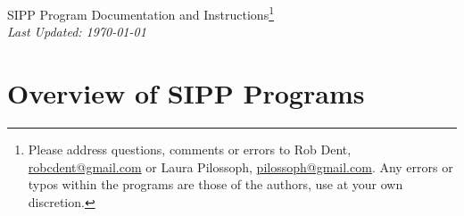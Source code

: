 \documentclass{article}
\begin{document}
\begin{center}
{\Large \sc SIPP Program Documentation and Instructions\footnote{Please address questions, comments or errors to Rob Dent, \href{mailto:robcdent@gmail.com}{robcdent@gmail.com} or Laura Pilossoph, \href{mailto:pilossoph@gmail.com}{pilossoph@gmail.com}. Any errors or typos within the programs are those of the authors, use at your own discretion.}}\\
\vspace{.1in}
{\it \large Last Updated: \today}
\end{center}
\vspace{1in}
\tableofcontents

\newpage
\vspace{0.5in}
\section{Overview of SIPP Programs}
\end{document}
